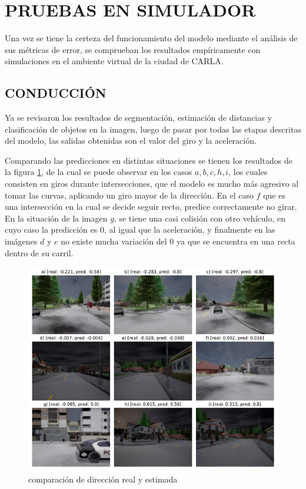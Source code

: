 \section{PRUEBAS EN SIMULADOR} \label{pruebas-simulador}
Una vez se tiene la certeza del funcionamiento del modelo mediante el análisis de sus métricas de error, se comprueban los resultados empíricamente con simulaciones en el ambiente virtual de la ciudad de CARLA.
\subsection{CONDUCCIÓN}
Ya se revisaron los resultados de segmentación, estimación de distancias y clasificación de objetos en la imagen, luego de pasar por todas las etapas descritas del modelo, las salidas obtenidas son el valor del giro y la aceleración.

Comparando las predicciones en distintas situaciones se tienen los resultados de la figura \ref{steer}, de la cual se puede observar en los casos $a, b, c, h, i$, los cuales consisten en giros durante intersecciones, que el modelo es mucho más agresivo al tomar las curvas, aplicando un giro mayor de la dirección. En el caso $f$ que es una intersección en la cual se decide seguir recto, predice correctamente no girar. En la situación de la imagen $g$, se tiene una casi colisión con otro vehículo, en cuyo caso la predicción es 0, al igual que la aceleración, y finalmente en las imágenes $d$ y $e$ no existe mucha variación del $0$ ya que se encuentra en una recta dentro de su carril.

\begin{figure}[H]
	\centering
	\includegraphics[scale=0.63]{imagenes/preds/steer}
	\caption[Comparación de Dirección Real y Estimada]{comparación de dirección real y estimada}
	\label{steer}
\end{figure}

